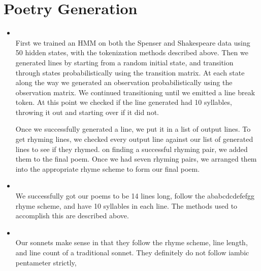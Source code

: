 \section{Poetry Generation}
\medskip
\begin{itemize}



    \item {} \\
    First we trained an HMM on both the Spenser and Shakespeare data using 50
    hidden states, with the tokenization methods described above. Then we generated
    lines by starting from a random initial state, and transition through states
    probabilistically using the transition matrix. At each state along the way we
    generated an observation probabilistically using the observation matrix. We
    continued transitioning until we emitted a line break token. At this point
    we checked if the line generated had 10 syllables, throwing it out and starting
    over if it did not.

    Once we successfully generated a line, we put it in a list of output lines.
    To get rhyming lines, we checked every output line against our list of generated
    lines to see if they rhymed. on finding a successful rhyming pair, we added them
    to the final poem. Once we had seven rhyming pairs, we arranged them into the
    appropriate rhyme scheme to form our final poem.
        
    \item {} \\
    We successfully got our poems to be 14 lines long, follow the ababcdcdefefgg
    rhyme scheme, and have 10 syllables in each line. The methods used to accomplish 
    this are described above. 

    \item {} \\
    Our sonnets make sense in that they follow the rhyme scheme, line length,
    and line count of a traditional sonnet. They definitely do not follow 
    iambic pentameter strictly, 

\end{itemize}



